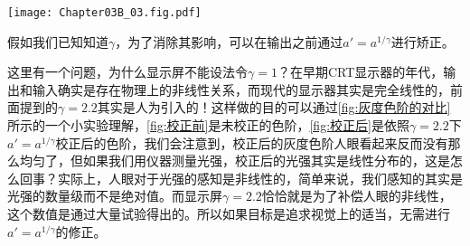 \begin{Figure}[伽马值的测定方法]
    \texttt{[image: Chapter03B\_03.fig.pdf]}
\end{Figure}

假如我们已知知道$\gamma$，为了消除其影响，可以在输出之前通过$a'=a^{1/\gamma}$进行矫正。

\begin{Figure}[灰度色阶的对比]

\end{Figure}

这里有一个问题，为什么显示屏不能设法令$\gamma=1$？在早期CRT显示器的年代，输出和输入确实是存在物理上的非线性关系，而现代的显示器其实是完全线性的，前面提到的$\gamma=2.2$其实是人为引入的！这样做的目的可以通过\cref{fig:灰度色阶的对比}所示的一个小实验理解，\cref{fig:校正前}是未校正的色阶，\cref{fig:校正后}是依照$\gamma=2.2$下$a'=a^{1/\gamma}$校正后的色阶，我们会注意到，校正后的灰度色阶人眼看起来反而没有那么均匀了，但如果我们用仪器测量光强，校正后的光强其实是线性分布的，这是怎么回事？实际上，人眼对于光强的感知是非线性的，简单来说，我们感知的其实是光强的数量级而不是绝对值。而显示屏$\gamma=2.2$恰恰就是为了补偿人眼的非线性，这个数值是通过大量试验得出的。所以如果目标是追求视觉上的适当，无需进行$a'=a^{1/\gamma}$的修正。